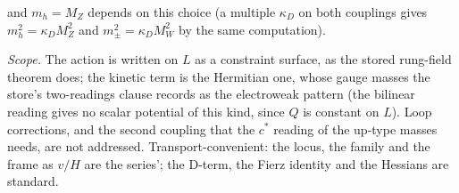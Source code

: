 and $m_{h} = M_{Z}$ depends on this choice (a multiple $\kappa_{D}$ on both couplings gives $m_{h}^{2} = \kappa_{D}M_{Z}^{2}$ and $m_{\pm}^{2} = \kappa_{D}M_{W}^{2}$ by the same computation).

\emph{Scope.} The action is written on $L$ as a constraint surface, as the stored rung-field theorem does; the kinetic term is the Hermitian one, whose gauge masses the store's two-readings clause records as the electroweak pattern (the bilinear reading gives no scalar potential of this kind, since $Q$ is constant on $L$). Loop corrections, and the second coupling that the $c^{*}$ reading of the up-type masses needs, are not addressed. Transport-convenient: the locus, the family and the frame as $v/H$ are the series'; the D-term, the Fierz identity and the Hessians are standard.
